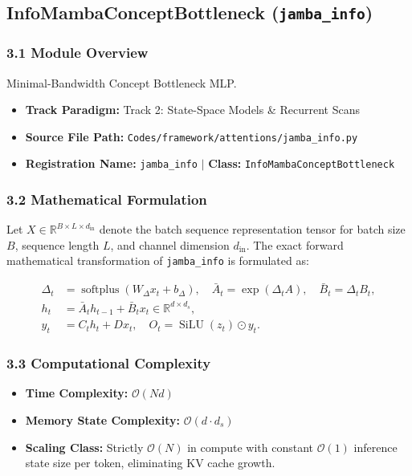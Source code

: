 \subsection{InfoMambaConceptBottleneck (\texttt{jamba\_info})}
\label{sec:app_module_jamba_info}

\subsubsection*{3.1 Module Overview}
Minimal-Bandwidth Concept Bottleneck MLP.
\begin{itemize}
    \item \textbf{Track Paradigm:} Track 2: State-Space Models & Recurrent Scans
    \item \textbf{Source File Path:} \texttt{Codes/framework/attentions/jamba\_info.py}
    \item \textbf{Registration Name:} \texttt{jamba\_info} $\mid$ \textbf{Class:} \texttt{InfoMambaConceptBottleneck}
\end{itemize}

\subsubsection*{3.2 Mathematical Formulation}
Let $X \in \mathbb{R}^{B \times L \times d_{\text{in}}}$ denote the batch sequence representation tensor for batch size $B$, sequence length $L$, and channel dimension $d_{\text{in}}$. The exact forward mathematical transformation of \texttt{jamba\_info} is formulated as:

\begin{align}
\Delta_t &= \operatorname{softplus}(W_\Delta x_t + b_\Delta), \quad \bar{A}_t = \exp(\Delta_t A), \quad \bar{B}_t = \Delta_t B_t, \\
h_t &= \bar{A}_t h_{t-1} + \bar{B}_t x_t \in \mathbb{R}^{d \times d_s}, \\
y_t &= C_t h_t + D x_t, \quad O_t = \operatorname{SiLU}(z_t) \odot y_t.
\end{align}


\subsubsection*{3.3 Computational Complexity}
\begin{itemize}
    \item \textbf{Time Complexity:} $\mathcal{O}(N d)$
    \item \textbf{Memory State Complexity:} $\mathcal{O}(d \cdot d_s)$
    \item \textbf{Scaling Class:} Strictly $\mathcal{O}(N)$ in compute with constant $\mathcal{O}(1)$ inference state size per token, eliminating KV cache growth.
\end{itemize}

